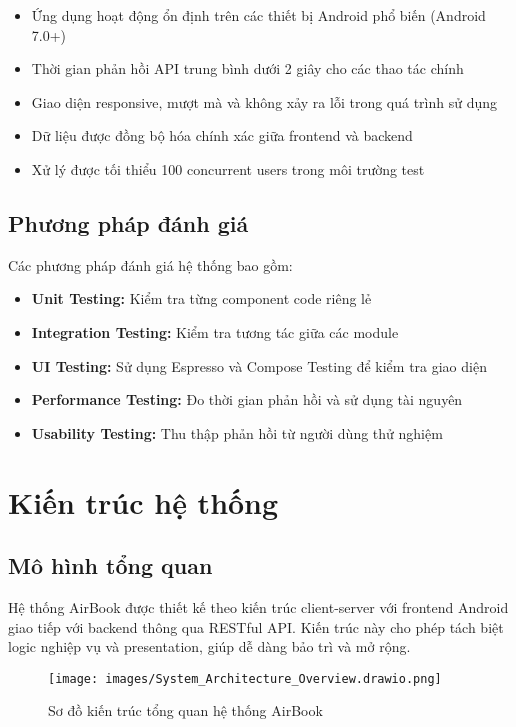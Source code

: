 \begin{itemize}[leftmargin=1cm]
    \item Ứng dụng hoạt động ổn định trên các thiết bị Android phổ biến (Android 7.0+)
    \item Thời gian phản hồi API trung bình dưới 2 giây cho các thao tác chính
    \item Giao diện responsive, mượt mà và không xảy ra lỗi trong quá trình sử dụng
    \item Dữ liệu được đồng bộ hóa chính xác giữa frontend và backend
    \item Xử lý được tối thiểu 100 concurrent users trong môi trường test
\end{itemize}

\subsection{Phương pháp đánh giá}
Các phương pháp đánh giá hệ thống bao gồm:

\begin{itemize}[leftmargin=1cm]
    \item \textbf{Unit Testing:} Kiểm tra từng component code riêng lẻ
    \item \textbf{Integration Testing:} Kiểm tra tương tác giữa các module
    \item \textbf{UI Testing:} Sử dụng Espresso và Compose Testing để kiểm tra giao diện
    \item \textbf{Performance Testing:} Đo thời gian phản hồi và sử dụng tài nguyên
    \item \textbf{Usability Testing:} Thu thập phản hồi từ người dùng thử nghiệm
\end{itemize}

\section{Kiến trúc hệ thống}
\subsection{Mô hình tổng quan}
Hệ thống AirBook được thiết kế theo kiến trúc client-server với frontend Android giao tiếp với backend thông qua RESTful API. Kiến trúc này cho phép tách biệt logic nghiệp vụ và presentation, giúp dễ dàng bảo trì và mở rộng.

\begin{figure}[H]
\centering
\texttt{[image: images/System\_Architecture\_Overview.drawio.png]}
\caption{Sơ đồ kiến trúc tổng quan hệ thống AirBook}
\end{figure}

